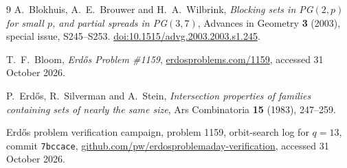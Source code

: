\documentclass[11pt]{article}
\theoremstyle{remark}
\begin{document}
\begin{thebibliography}{9}
A.~Blokhuis, A.~E.~Brouwer and H.~A.~Wilbrink, \emph{Blocking sets in
PG$(2,p)$ for small $p$, and partial spreads in PG$(3,7)$}, Advances in
Geometry \textbf{3} (2003), special issue, S245--S253.
\href{https://doi.org/10.1515/advg.2003.2003.s1.245}{doi:10.1515/advg.2003.2003.s1.245}.

T.~F.~Bloom, \emph{Erd\H{o}s Problem \#1159},
\href{https://www.erdosproblems.com/1159}{erdosproblems.com/1159},
accessed 31 October 2026.

P.~Erd\H{o}s, R.~Silverman and A.~Stein, \emph{Intersection properties of
families containing sets of nearly the same size}, Ars Combinatoria
\textbf{15} (1983), 247--259.

Erd\H{o}s problem verification campaign, problem 1159, orbit-search log for
$q=13$, commit \texttt{7bccace},
\href{https://github.com/pw/erdosproblemaday-verification/blob/7bccace07c6b555623be274558e463b5ef2c3ea1/1159/1159-klein-blocks-pg2-11-and-the-q13-question/orbitzoo/orbitzoo_q13.log}{github.com/pw/erdosproblemaday-verification},
accessed 31 October 2026.
\end{thebibliography}
\end{document}
